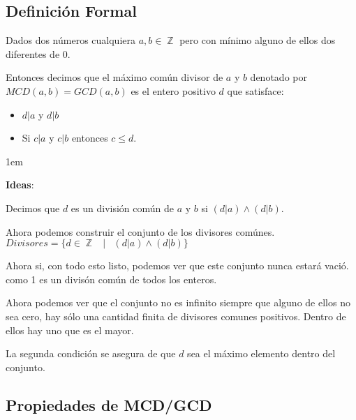 \documentclass[12pt]{report}                                    %
\newenvironment{SmallIndentation}[1][0.75em]                    %
    {\begin{adjustwidth}{#1}{}\begin{footnotesize}}                 %
    {\end{footnotesize}\end{adjustwidth}}                           %
\DeclareMathOperator \Space {\quad}                             %
\DeclareMathOperator \MiniSpace {\;}                            %
\newcommand \Such {\MiniSpace|\MiniSpace}                       %
\DeclareMathOperator \Integers  {\mathbb{Z}}                     %
\begin{document}
        \subsection*{Definición Formal}

            Dados dos números cualquiera $a, b \in \Integers$ pero con mínimo alguno de ellos dos diferentes
            de 0. 

            Entonces decimos que el máximo común divisor de $a$ y $b$ denotado por $MCD(a,b) = GCD(a,b)$
            es el entero positivo $d$ que satisface:

            \begin{itemize}
                \item $d|a$ y $d|b$
                \item Si $c|a$ y $c|b$ entonces $c \leq d$.
            \end{itemize}


            \begin{SmallIndentation}[1em]
                \textbf{Ideas}:

                Decimos que $d$ es un división común de $a$ y $b$ si $(d|a) \land (d|b)$.

                Ahora podemos construir el conjunto de los divisores comúnes.
                $Divisores = \{ d \in \Integers \Such (d|a) \land (d|b) \}$

                Ahora si, con todo esto listo, podemos ver que este conjunto nunca estará vació. 
                como 1 es un divisón común de todos los enteros.

                Ahora podemos ver que el conjunto no es infinito siempre que alguno de ellos no sea cero,
                hay sólo una cantidad finita de divisores comunes positivos. Dentro de ellos hay uno
                que es el mayor.

                La segunda condición se asegura de que $d$ sea el máximo elemento dentro del conjunto.

            \end{SmallIndentation}




        \clearpage
        \subsection{Propiedades de MCD/GCD}
\end{document}
